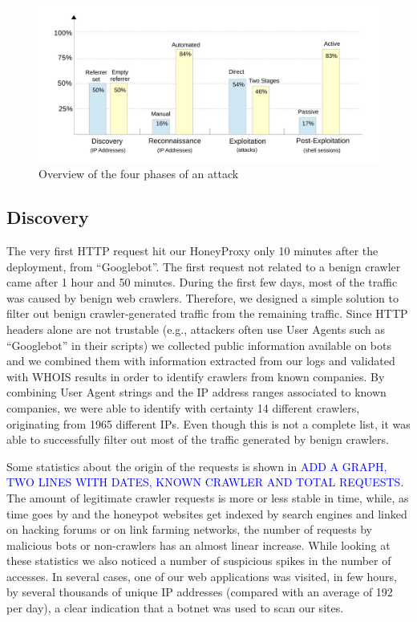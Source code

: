 \begin{figure}[tbh]
\centerline{\includegraphics[scale=0.4]{Images/overview_phases.jpg}}
\caption{Overview of the four phases of an attack\label{fig:overview_phases}}
\end{figure}

\subsection{Discovery}
The very first HTTP request hit our HoneyProxy only 10 minutes after the deployment, from ``Googlebot''. The first request not related to a benign crawler came after 1 hour and 50 minutes.
During the first few days, most of the traffic was caused by benign web crawlers. Therefore, we designed a simple solution to filter out benign crawler-generated traffic from the remaining traffic. Since HTTP headers alone are not trustable (e.g., attackers often use User Agents such as ``Googlebot'' in their scripts) we collected public information available on bots and we combined them with information extracted from our logs and validated with WHOIS results in order to identify crawlers from known companies. By combining User Agent strings and the IP address ranges associated to known companies, we were able to identify with certainty 14 different crawlers, originating from 1965 different IPs. Even though this is not a complete list, it was able to successfully filter out most of the traffic generated by benign crawlers.

Some statistics about the origin of the requests is shown in \textcolor{blue}{ADD A GRAPH, TWO LINES WITH DATES, KNOWN CRAWLER AND TOTAL REQUESTS}. The amount of legitimate crawler requests is more or less stable in time, while, as time goes by and the honeypot websites get indexed by search engines and linked on hacking forums or on link farming networks, the number of requests by malicious bots or non-crawlers has an almost linear increase.
While looking at these statistics we also noticed a number of suspicious spikes in the number of accesses. In several cases, one of our web applications was visited, in few hours, by several thousands of unique IP addresses (compared with an average of 192 per day), a clear indication that a botnet was used to scan our sites.

